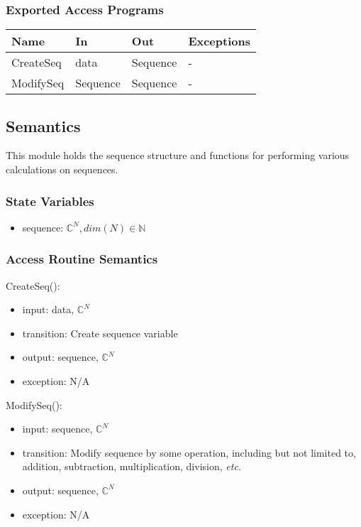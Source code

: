 \documentclass[12pt, titlepage]{article}
\begin{document}
\subsubsection{Exported Access Programs}

\begin{center}
    \begin{tabular}{p{2cm} p{4cm} p{4cm} p{2cm}}
        \hline
        \textbf{Name} & \textbf{In} & \textbf{Out} & \textbf{Exceptions} \\
        \hline
        CreateSeq & data & Sequence & - \\
        ModifySeq & Sequence & Sequence & - \\
        \hline
    \end{tabular}
\end{center}

\subsection{Semantics}
This module holds the sequence structure and functions for performing various
calculations on sequences.

\subsubsection{State Variables}
\begin{itemize}
    \item sequence: $\mathbb{C}^N, dim(N) \in \mathbb{N}$
\end{itemize}

\subsubsection{Access Routine Semantics}

\noindent CreateSeq():
\begin{itemize}
    \item input: data, $\mathbb{C}^N$
    \item transition: Create sequence variable
    \item output: sequence, $\mathbb{C}^N$
    \item exception: N/A
\end{itemize}

\noindent ModifySeq():
\begin{itemize}
    \item input: sequence, $\mathbb{C}^N$
    \item transition: Modify sequence by some operation, including but not limited
    to, addition, subtraction, multiplication, division, \textit{etc.}
    \item output: sequence, $\mathbb{C}^N$
    \item exception: N/A
\end{itemize}
\end{document}
